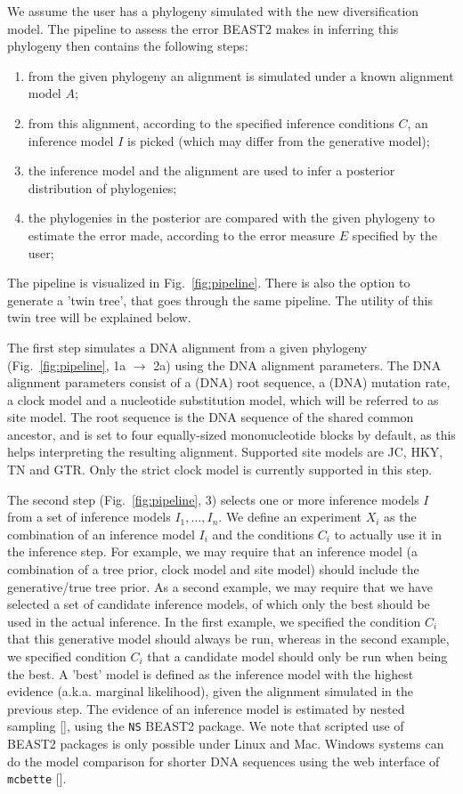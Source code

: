 We assume the user has a phylogeny simulated with the new diversification model. The pipeline to assess the error BEAST2 makes in inferring this phylogeny then contains the following steps:
\begin{enumerate}
  \item from the given phylogeny an alignment is simulated 
    under a known alignment model $\mathit{A}$;
  \item from this alignment, according to the specified inference conditions $\mathit{C}$, 
    an inference model $\mathit{I}$ is picked (which may differ from the 
    generative model);
  \item the inference model and the alignment are used 
    to infer a posterior distribution of phylogenies;
  \item the phylogenies in the posterior are compared with the given phylogeny 
    to estimate the error made, according to the error measure $\mathit{E}$ specified 
    by the user;
\end{enumerate}
The pipeline is visualized in Fig.~\ref{fig:pipeline}. 
There is also the option to generate a 'twin tree', 
that goes through the same pipeline. 
The utility of this twin tree will be explained below.

The first step simulates a DNA alignment from a given 
phylogeny (Fig.~\ref{fig:pipeline}, 1a $\rightarrow$ 2a)
using the DNA alignment parameters.
The DNA alignment parameters consist of a (DNA) root sequence, a (DNA) mutation rate, a clock model and a nucleotide substitution
model, which will be referred to as site model.
The root sequence is the DNA sequence of the shared common ancestor,
and is set to four equally-sized mononucleotide blocks by default, as this
helps interpreting the resulting alignment.
Supported site models are JC, HKY, TN and GTR. Only the strict
clock model is currently supported in this step.

The second step (Fig.~\ref{fig:pipeline}, 3)
selects one or more inference models $I$ from a set of inference 
models $I_{1},\dots,I_{n}$. 
We define an experiment $X_{i}$ as the combination of 
an inference model $I_{i}$ and the conditions $C_{i}$ 
to actually use it in the inference step.
For example, we may require that an inference
model (a combination of a tree prior, clock model and site model) 
should include the generative/true tree prior. 
As a second example, we may require that we have selected a set of 
candidate inference models,
of which only the best should be used in the actual inference.
In the first example, we specified the condition $C_{i}$ that this
generative model should always be run, whereas in the second example,
we specified condition $C_{i}$ that a candidate model should only be run
when being the best.
A 'best' model is defined as the inference model with
the highest evidence (a.k.a. marginal likelihood), given the alignment 
simulated in the previous step.
The evidence of an inference model is estimated by nested 
sampling [\cite{maturana2018model}], using the \verb;NS; BEAST2 package. We note that scripted use of BEAST2 packages is only possible under Linux and Mac.
Windows systems can do the model comparison for shorter DNA sequences 
using the web interface of \verb;mcbette; [\cite{mcbette}].


